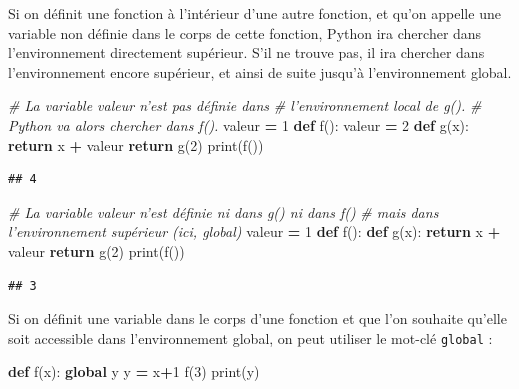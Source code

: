 \documentclass[12pt,]{book}
\newenvironment{Shaded}{\begin{snugshade}}{\end{snugshade}}
\newcommand{\KeywordTok}[1]{\textcolor[rgb]{0.13,0.29,0.53}{\textbf{#1}}}
\newcommand{\DecValTok}[1]{\textcolor[rgb]{0.00,0.00,0.81}{#1}}
\newcommand{\CommentTok}[1]{\textcolor[rgb]{0.56,0.35,0.01}{\textit{#1}}}
\newcommand{\ControlFlowTok}[1]{\textcolor[rgb]{0.13,0.29,0.53}{\textbf{#1}}}
\newcommand{\OperatorTok}[1]{\textcolor[rgb]{0.81,0.36,0.00}{\textbf{#1}}}
\newcommand{\BuiltInTok}[1]{#1}
\newcommand{\NormalTok}[1]{#1}
\numberwithin{equation}{section}
\numberwithin{countremarque}{section}
\begin{document}
Si on définit une fonction à l'intérieur d'une autre fonction, et qu'on
appelle une variable non définie dans le corps de cette fonction, Python
ira chercher dans l'environnement directement supérieur. S'il ne trouve
pas, il ira chercher dans l'environnement encore supérieur, et ainsi de
suite jusqu'à l'environnement global.

\begin{Shaded}
\begin{Highlighting}[]
\CommentTok{# La variable valeur n'est pas définie dans}
\CommentTok{# l'environnement local de g().}
\CommentTok{# Python va alors chercher dans f().}
\NormalTok{valeur }\OperatorTok{=} \DecValTok{1}
\KeywordTok{def}\NormalTok{ f():}
\NormalTok{  valeur }\OperatorTok{=} \DecValTok{2}
  \KeywordTok{def}\NormalTok{ g(x):}
    \ControlFlowTok{return}\NormalTok{ x }\OperatorTok{+}\NormalTok{ valeur}
  \ControlFlowTok{return}\NormalTok{ g(}\DecValTok{2}\NormalTok{)}
\BuiltInTok{print}\NormalTok{(f())}
\end{Highlighting}
\end{Shaded}

\begin{lstlisting}
## 4
\end{lstlisting}

\begin{Shaded}
\begin{Highlighting}[]
\CommentTok{# La variable valeur n'est définie ni dans g() ni dans f()}
\CommentTok{# mais dans l'environnement supérieur (ici, global)}
\NormalTok{valeur }\OperatorTok{=} \DecValTok{1}
\KeywordTok{def}\NormalTok{ f():}
  \KeywordTok{def}\NormalTok{ g(x):}
    \ControlFlowTok{return}\NormalTok{ x }\OperatorTok{+}\NormalTok{ valeur}
  \ControlFlowTok{return}\NormalTok{ g(}\DecValTok{2}\NormalTok{)}
\BuiltInTok{print}\NormalTok{(f())}
\end{Highlighting}
\end{Shaded}

\begin{lstlisting}
## 3
\end{lstlisting}

Si on définit une variable dans le corps d'une fonction et que l'on
souhaite qu'elle soit accessible dans l'environnement global, on peut
utiliser le mot-clé \texttt{global} :

\begin{Shaded}
\begin{Highlighting}[]
\KeywordTok{def}\NormalTok{ f(x):}
  \KeywordTok{global}\NormalTok{ y}
\NormalTok{  y }\OperatorTok{=}\NormalTok{ x}\OperatorTok{+}\DecValTok{1}
\NormalTok{f(}\DecValTok{3}\NormalTok{)}
\BuiltInTok{print}\NormalTok{(y)}
\end{Highlighting}
\end{Shaded}
\end{document}
